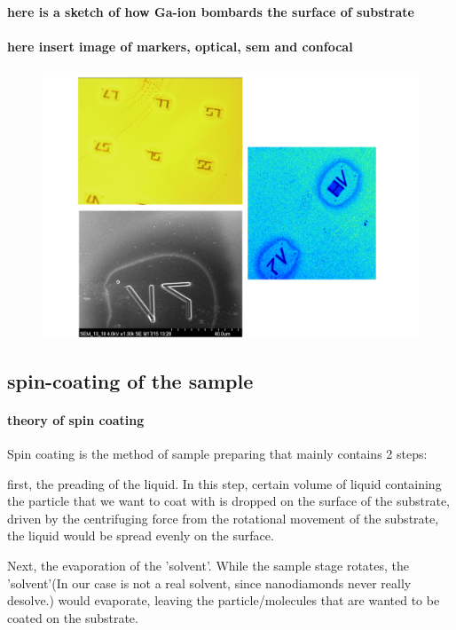\paragraph{here is a sketch of how Ga-ion bombards the surface of substrate}
\paragraph{here insert image of markers, optical, sem and confocal}
\FloatBarrier
\begin{figure}[h]
\centering
\includegraphics[width=1\linewidth]{Figures/pic/fib}
\caption{}
\label{fig:20150907sample214spincoated5}
\end{figure}
\FloatBarrier



\subsection{spin-coating of the sample}
\paragraph{theory of spin coating} 
Spin coating is the method of sample preparing that mainly contains 2 steps:

first, the preading of the liquid. In this step, certain volume of liquid containing the particle that we want to coat with is dropped on the surface of the substrate, driven by the centrifuging force from the rotational movement of the substrate, the liquid would be spread evenly on the surface.

Next, the evaporation of the 'solvent'. While the sample stage rotates, the 'solvent'(In our case is not a real solvent, since nanodiamonds never really desolve.) would evaporate, leaving the particle/molecules that are wanted to be coated on the substrate.

